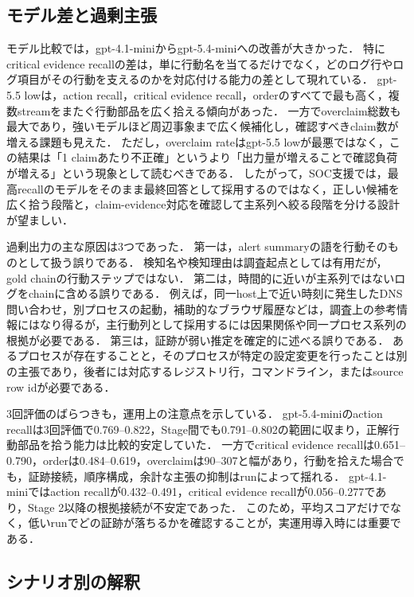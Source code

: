 \documentclass[a4paper,twocolumn,10pt]{article}
\newcommand{\code}[1]{{\small\ttfamily #1}}
\begin{document}
\subsection{モデル差と過剰主張}

モデル比較では，\code{gpt-4.1-mini}から\code{gpt-5.4-mini}への改善が大きかった．
特にcritical evidence recallの差は，単に行動名を当てるだけでなく，どのログ行やログ項目がその行動を支えるのかを対応付ける能力の差として現れている．
\code{gpt-5.5 low}は，action recall，critical evidence recall，orderのすべてで最も高く，複数streamをまたぐ行動部品を広く拾える傾向があった．
一方でoverclaim総数も最大であり，強いモデルほど周辺事象まで広く候補化し，確認すべきclaim数が増える課題も見えた．
ただし，overclaim rateは\code{gpt-5.5 low}が最悪ではなく，この結果は「1 claimあたり不正確」というより「出力量が増えることで確認負荷が増える」という現象として読むべきである．
したがって，SOC支援では，最高recallのモデルをそのまま最終回答として採用するのではなく，正しい候補を広く拾う段階と，claim-evidence対応を確認して主系列へ絞る段階を分ける設計が望ましい．

過剰出力の主な原因は3つであった．
第一は，alert summaryの語を行動そのものとして扱う誤りである．
検知名や検知理由は調査起点としては有用だが，gold chainの行動ステップではない．
第二は，時間的に近いが主系列ではないログをchainに含める誤りである．
例えば，同一host上で近い時刻に発生したDNS問い合わせ，別プロセスの起動，補助的なブラウザ履歴などは，調査上の参考情報にはなり得るが，主行動列として採用するには因果関係や同一プロセス系列の根拠が必要である．
第三は，証跡が弱い推定を確定的に述べる誤りである．
あるプロセスが存在することと，そのプロセスが特定の設定変更を行ったことは別の主張であり，後者には対応するレジストリ行，コマンドライン，またはsource row idが必要である．

3回評価のばらつきも，運用上の注意点を示している．
\code{gpt-5.4-mini}のaction recallは3回評価で0.769--0.822，Stage間でも0.791--0.802の範囲に収まり，正解行動部品を拾う能力は比較的安定していた．
一方でcritical evidence recallは0.651--0.790，orderは0.484--0.619，overclaimは90--307と幅があり，行動を拾えた場合でも，証跡接続，順序構成，余計な主張の抑制はrunによって揺れる．
\code{gpt-4.1-mini}ではaction recallが0.432--0.491，critical evidence recallが0.056--0.277であり，Stage 2以降の根拠接続が不安定であった．
このため，平均スコアだけでなく，低いrunでどの証跡が落ちるかを確認することが，実運用導入時には重要である．

\subsection{シナリオ別の解釈}
\end{document}
